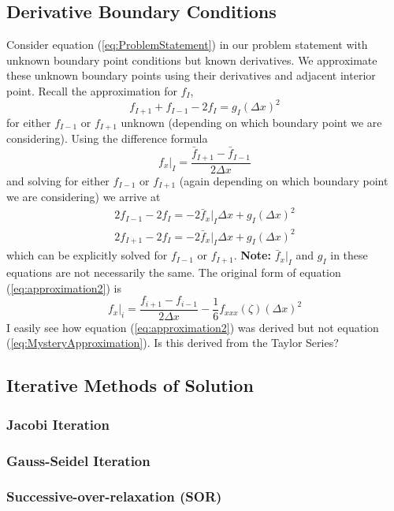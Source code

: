 \documentclass[../main.tex]{subfiles}
\begin{document}
\subsection{Derivative Boundary Conditions}
Consider equation (\ref{eq:ProblemStatement}) in our problem statement with unknown boundary point conditions but known derivatives. We approximate these unknown boundary points using their derivatives and adjacent interior point. Recall the approximation for $f_I$,
\begin{equation}
f_{I+1} +f_{I-1}-2f_I = g_I (\Delta x)^2
\end{equation}
for either $f_{I-1}$ or $f_{I+1}$ unknown (depending on which boundary point we are considering). Using the difference formula
\begin{equation}\label{eq:approximation2}
f_x|_I = \frac{\bar{f}_{I+1}-\bar{f}_{I-1}}{2\Delta x}
\end{equation}
and solving for either $f_{I-1}$ or $f_{I+1}$ (again depending on which boundary point we are considering) we arrive at
\begin{align}
2f_{I-1}-2f_I=-2\bar{f}_x|_I \Delta x + g_I (\Delta x)^2\\
2f_{I+1}-2f_I=-2\bar{f}_x|_I \Delta x + g_I (\Delta x)^2
\end{align}
which can be explicitly solved for $f_{I-1}$ or $f_{I+1}$. \textbf{Note:} $\bar{f}_x|_I$ and $g_I$ in these equations are not necessarily the same.
\color{red}The original form of equation (\ref{eq:approximation2}) is
\begin{equation}\label{eq:MysteryApproximation}
f_x|_i = \frac{f_{i+1} - f_{i-1}}{2\Delta x} - \frac{1}{6}f_{xxx}(\zeta)(\Delta x)^2
\end{equation}
I easily see how equation (\ref{eq:approximation2}) was derived but not equation (\ref{eq:MysteryApproximation}). Is this derived from the Taylor Series?
\color{black}

\subsection{Iterative Methods of Solution}
\subsubsection{Jacobi Iteration}
\subsubsection{Gauss-Seidel Iteration}
\subsubsection{Successive-over-relaxation (SOR) }
\end{document}

